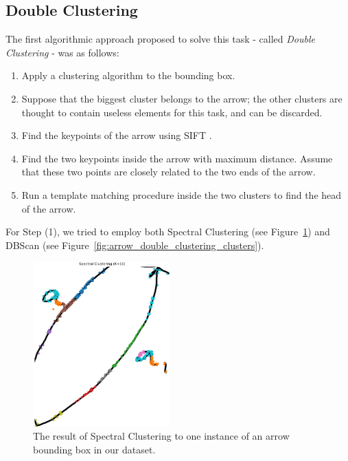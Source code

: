 \documentclass[conference]{IEEEtran}
\begin{document}
\begin{appendices}

\section{Double Clustering}
\label{double_clustering}
The first algorithmic approach proposed to solve this task - called \textit{Double Clustering} - was as follows: 
\begin{enumerate}
	\item Apply a clustering algorithm to the bounding box.
	\item Suppose that the biggest cluster belongs to the arrow; the other clusters are thought to contain useless elements for this task, and can be discarded.
	\item Find the keypoints of the arrow using SIFT \cite{SIFT}.
	\item Find the two keypoints inside the arrow with maximum distance. Assume that these two points are closely related to the two ends of the arrow.
	\item Run a template matching procedure inside the two clusters to find the head of the arrow.
\end{enumerate}

For Step (1), we tried to employ both Spectral Clustering \cite{spectralclustering} (see Figure~\ref{fig:spectral_clustering}) and DBScan \cite{dbscan} (see Figure~\ref{fig:arrow_double_clustering_clusters}).

\begin{figure}[H]
	\centering
	\includegraphics[width=150pt]{spectral_clustering.png}
	\caption{The result of Spectral Clustering to one instance of an arrow bounding box in our dataset.}
	\label{fig:spectral_clustering}
\end{figure}


\end{appendices}
\end{document}
